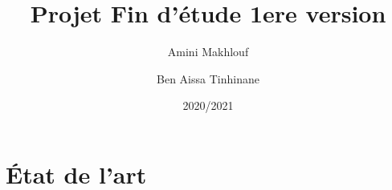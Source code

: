 \documentclass[11pt]{report}
\title{Projet Fin d'étude 1ere version}
\author{Amini Makhlouf \and Ben Aissa Tinhinane}
\date{2020/2021}
\begin{document}
    \maketitle
    \tableofcontents
    \listoffigures
    
    \part{État de l'art}
    
    
    
    
	
\end{document}

